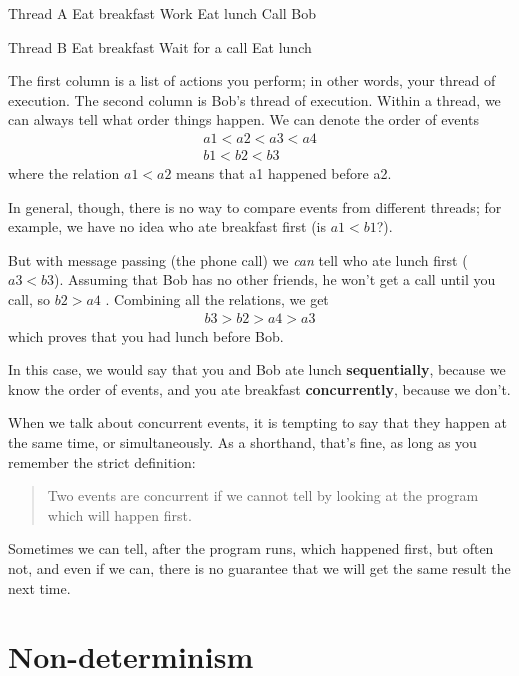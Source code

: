 \begin{lsthalfbox}[before skip=0.6em]{Thread A}
Eat breakfast 
Work          
Eat lunch     
Call Bob
\end{lsthalfbox}
\begin{lsthalfbox}[after skip=0.6em]{Thread B}
Eat breakfast
Wait for a call
Eat lunch
\end{lsthalfbox}

The first column is a list of actions you perform; in other words,
your thread of execution.  The second column is Bob's thread of
execution.  Within a thread, we can always tell what order things
happen.  We can denote the order of events
%
\begin{eqnarray*}
a1 < a2 < a3 < a4  \\
b1 < b2 < b3
\end{eqnarray*}
%
where the relation $a1 < a2$ means that a1 happened before a2.

In general, though, there is no way to compare events from different
threads; for example, we have no idea who ate breakfast first (is $a1
< b1$?).

But with message passing (the phone call) we {\em can} tell who ate
lunch first ($a3 < b3$).  Assuming that Bob has no other friends, he
won't get a call until you call, so $b2 > a4$ .  Combining all the
relations, we get
%
\begin{eqnarray*}
b3 > b2 > a4 > a3
\end{eqnarray*}
%
which proves that you had lunch before Bob.

In this case, we would say that you and Bob ate lunch
{\bf sequentially}, because we know the order of events, and you
ate breakfast {\bf concurrently}, because we don't.

When we talk about concurrent events, it is tempting to say
that they happen at the same time, or simultaneously.  As a
shorthand, that's fine, as long as you remember the strict
definition:

\begin{quote}
Two events are concurrent if we cannot tell by looking at
the program which will happen first.
\end{quote}

Sometimes we can tell, after the program runs, which happened first,
but often not, and even if we can, there is no guarantee that we will
get the same result the next time.


\section {Non-determinism}

